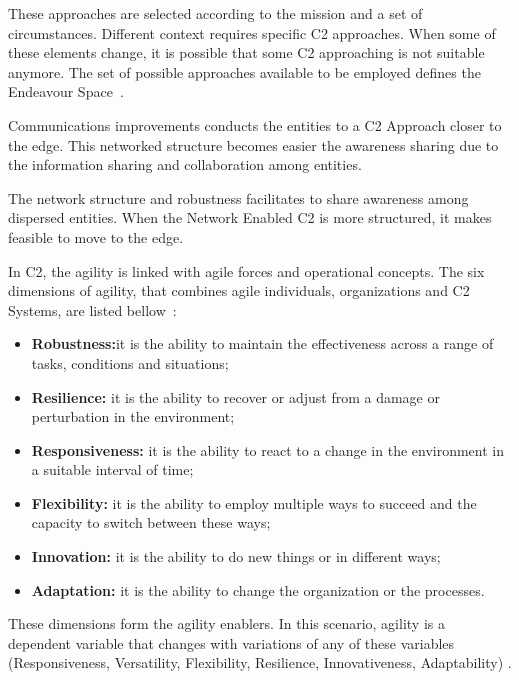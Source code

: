 These approaches are selected according to the mission and a set of circumstances. Different \gls{context} requires specific C2 approaches. When some of these elements change, it is possible that some C2 approaching is not suitable anymore. The set of possible approaches available to be employed defines the Endeavour Space~\cite{FRANCE2014}.

Communications improvements conducts the entities to a C2 Approach closer to the edge. This networked structure becomes easier the awareness sharing due to the information sharing and collaboration among entities.



The network structure and robustness facilitates to share awareness among dispersed entities. When the Network Enabled C2 is more structured, it makes feasible to move to the edge. 

%

In C2, the agility is linked with agile forces and operational concepts. The six dimensions of agility, that combines agile individuals, organizations and C2 Systems, are listed bellow~\cite{Power01}:

\begin{itemize}
    \item \textbf{Robustness:}it is the ability to maintain the effectiveness across a range of tasks, conditions and situations;
    \item \textbf{Resilience:} it is the ability to recover or adjust from a damage or perturbation in the environment;
    \item \textbf{Responsiveness:} it is the ability to react to a change in the environment in a suitable interval of time;
    \item \textbf{Flexibility:} it is the ability to employ multiple ways to succeed and the capacity to switch between these ways;
    \item \textbf{Innovation:} it is the ability to do new things or in different ways;
    \item \textbf{Adaptation:} it is the ability to change the organization or the processes.
\end{itemize}

These dimensions form the agility enablers. In this scenario, agility is a dependent variable that changes with variations of any of these variables (Responsiveness, Versatility, Flexibility, Resilience, Innovativeness, Adaptability) \cite{FRANCE2014}.

